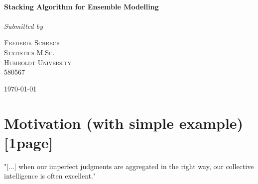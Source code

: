 \documentclass[12pt]{article}
\begin{document}
\begin{titlepage}
	\center
	\HRule\\[0.4cm]
	
	{\LARGE\bfseries Stacking Algorithm for Ensemble Modelling}\\[0.05cm] %
		\HRule\\[1.5cm]
	
			
			\textit{Submitted by}\\	
			\vspace{0.5cm}
			

	\begin{minipage}{0.5\textwidth}
		\begin{center}
			\large

			\textsc{Frederik Schreck \\
			Statistics M.Sc.\\
			Humboldt University\\
			580567} %
		\end{center}

	\end{minipage}
	

	\vfill\vfill\vfill\vfill %
	
	{\large\today} %
	
	\vfill %
	
\end{titlepage}


\tableofcontents
\thispagestyle{empty}
\clearpage
\setcounter{page}{1}
\newpage

\listoffigures
\listoftables
\thispagestyle{empty}
\clearpage
\setcounter{page}{1}


\section{Motivation (with simple example)[1page]}\label{Intro}
"[...] when our imperfect judgments are aggregated in the right way, our collective intelligence is often excellent."\citep[Foreword p.XIV]{surowiecki2005wisdom}\\
\end{document}
